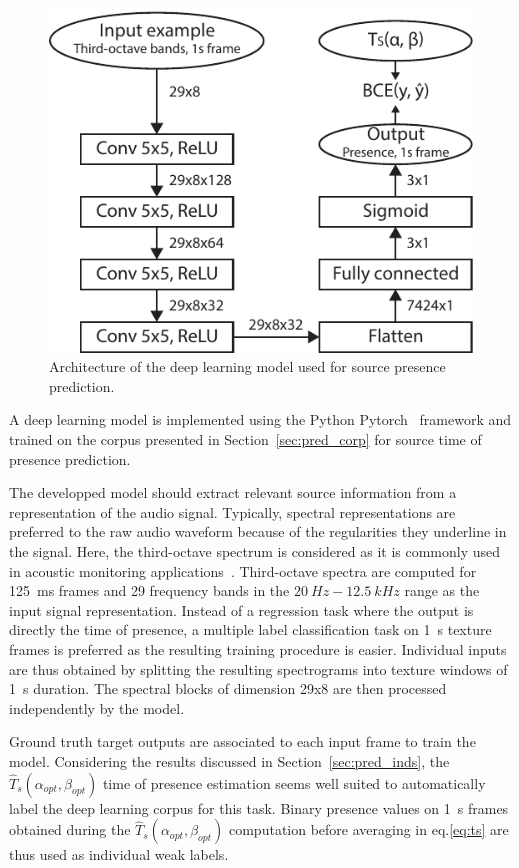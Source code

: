 \documentclass[twocolumn]{article}
\begin{document}
\begin{figure}[h!]
    \centering
    \includegraphics[width=\columnwidth]{figures/deep_arch.pdf}
    \caption{Architecture of the deep learning model used for source presence prediction.}\label{fig:deep_arch}
\end{figure}


A deep learning model is implemented using the Python Pytorch~\cite{paszke2017} framework and trained on the corpus presented in Section~\ref{sec:pred_corp} for source time of presence prediction.

The developped model should extract relevant source information from a representation of the audio signal. Typically, spectral representations are preferred to the raw audio waveform because of the regularities they underline in the signal. Here, the third-octave spectrum is considered as it is commonly used in acoustic monitoring applications~\cite{ardouin2018, gontier2017}. Third-octave spectra are computed for 125~ms frames and 29 frequency bands in the $20~Hz - 12.5~kHz$ range as the input signal representation. Instead of a regression task where the output is directly the time of presence, a multiple label classification task on 1~s texture frames is preferred as the resulting training procedure is easier. Individual inputs are thus obtained by splitting the resulting spectrograms into texture windows of 1~s duration. The spectral blocks of dimension 29x8 are then processed independently by the model.

Ground truth target outputs are associated to each input frame to train the model. Considering the results discussed in Section~\ref{sec:pred_inds}, the $\hat T_s(\alpha_{opt}, \beta_{opt})$ time of presence estimation seems well suited to automatically label the deep learning corpus for this task. Binary presence values on 1~s frames obtained during the $\hat T_s(\alpha_{opt}, \beta_{opt})$ computation before averaging in eq.\ref{eq:ts} are thus used as individual weak labels.
\end{document}
